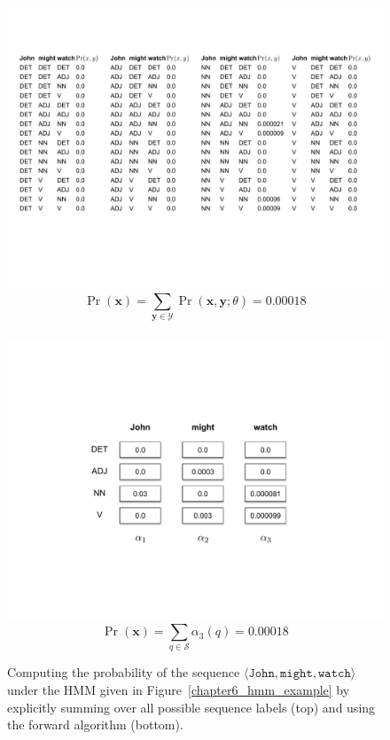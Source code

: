 \begin{figure}
\begin{center}
\includegraphics[scale=0.5]{figures/fig-ch6-enumerate.pdf}\\
\begin{displaymath}
\Pr(\textbf{x}) = \sum_{\textbf{y} \in \mathcal{Y}} \Pr(\textbf{x}, \textbf{y}; \theta) = 0.00018
\end{displaymath} \\

\includegraphics[scale=0.55]{figures/fig-ch6-q1new.pdf}\\
\begin{displaymath}
\Pr(\textbf{x}) = \sum_{q \in \mathcal{S}} \alpha_{3}(q) = 0.00018
\end{displaymath}
\end{center}\caption{Computing the probability of the sequence $\langle \texttt{John} , \texttt{might} , \texttt{watch} \rangle$ under the HMM given in Figure~\ref{chapter6_hmm_example} by explicitly summing over all possible sequence labels (top) and using the forward algorithm (bottom).}\label{chapter6_fig_question1}
\end{figure}

